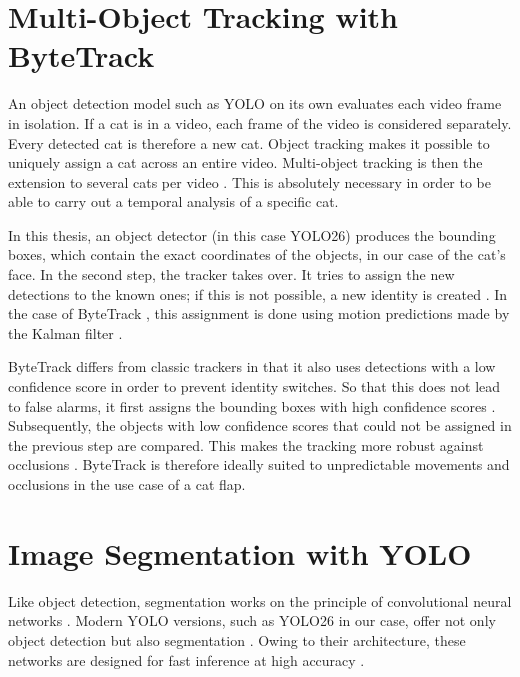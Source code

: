 \section{Multi-Object Tracking with ByteTrack}
\label{subsec:bytetrack}

An object detection model such as YOLO on its own evaluates each video frame in isolation. If a cat is in a video, each frame of the video is considered separately. Every detected cat is therefore a new cat. Object tracking makes it possible to uniquely assign a cat across an entire video. Multi-object tracking is then the extension to several cats per video \cite{luo2021mot}. This is absolutely necessary in order to be able to carry out a temporal analysis of a specific cat.

In this thesis, an object detector (in this case YOLO26) produces the bounding boxes, which contain the exact coordinates of the objects, in our case of the cat's face. In the second step, the tracker takes over. It tries to assign the new detections to the known ones; if this is not possible, a new identity is created \cite{bewley2016sort, kuhn1955hungarian}. In the case of ByteTrack \cite{zhang2022bytetrack}, this assignment is done using motion predictions made by the Kalman filter \cite{kalman1960new}.

ByteTrack differs from classic trackers \cite{bewley2016sort, wojke2017deepsort} in that it also uses detections with a low confidence score in order to prevent identity switches. So that this does not lead to false alarms, it first assigns the bounding boxes with high confidence scores \cite{zhang2022bytetrack}. Subsequently, the objects with low confidence scores that could not be assigned in the previous step are compared. This makes the tracking more robust against occlusions \cite{zhang2022bytetrack}. ByteTrack is therefore ideally suited to unpredictable movements and occlusions in the use case of a cat flap.

\section{Image Segmentation with YOLO}
\label{subsec:yolo_class}

Like object detection, segmentation works on the principle of convolutional neural networks \cite{lecun1998gradient, long2015fcn}. Modern YOLO versions, such as YOLO26 in our case, offer not only object detection but also segmentation \cite{jocher2024yolo}. Owing to their architecture, these networks are designed for fast inference at high accuracy \cite{bolya2019yolact}.

